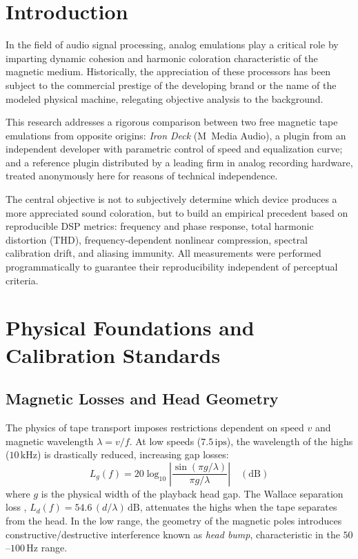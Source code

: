 \documentclass[10pt,conference]{IEEEtran}
\begin{document}
\section{Introduction}

In the field of audio signal processing, analog emulations play a critical role by imparting
dynamic cohesion and harmonic coloration characteristic of the magnetic medium. Historically,
the appreciation of these processors has been subject to the commercial prestige of the developing
brand or the name of the modeled physical machine, relegating objective analysis to the background.

This research addresses a rigorous comparison between two free magnetic tape emulations from
opposite origins: \emph{Iron Deck} (M~Media Audio), a plugin from an independent developer with
parametric control of speed and equalization curve; and a reference plugin distributed by a leading
firm in analog recording hardware, treated anonymously here for reasons of technical independence.

The central objective is not to subjectively determine which device produces a more appreciated
sound coloration, but to build an empirical precedent based on reproducible DSP metrics:
frequency and phase response, total harmonic distortion (THD), frequency-dependent nonlinear
compression, spectral calibration drift, and aliasing immunity. All measurements were performed
programmatically to guarantee their reproducibility independent of perceptual criteria.

\section{Physical Foundations and Calibration Standards}

\subsection{Magnetic Losses and Head Geometry}

The physics of tape transport imposes restrictions dependent on speed $v$ and
magnetic wavelength $\lambda = v/f$. At low speeds ($7.5\,\text{ips}$),
the wavelength of the highs ($10\,\text{kHz}$) is drastically reduced, increasing
gap losses:
\begin{equation}
L_g(f) = 20\log_{10}\!\left|\frac{\sin(\pi g/\lambda)}{\pi g/\lambda}\right| \quad (\text{dB})
\end{equation}
where $g$ is the physical width of the playback head gap. The Wallace separation loss
\cite{wallace}, $L_d(f)=54.6\,(d/\lambda)\,\text{dB}$, attenuates the highs when the tape
separates from the head. In the low range, the geometry of the magnetic poles introduces
constructive/destructive interference known as \emph{head bump}, characteristic in the
$50$–$100\,\text{Hz}$ range.
\end{document}
